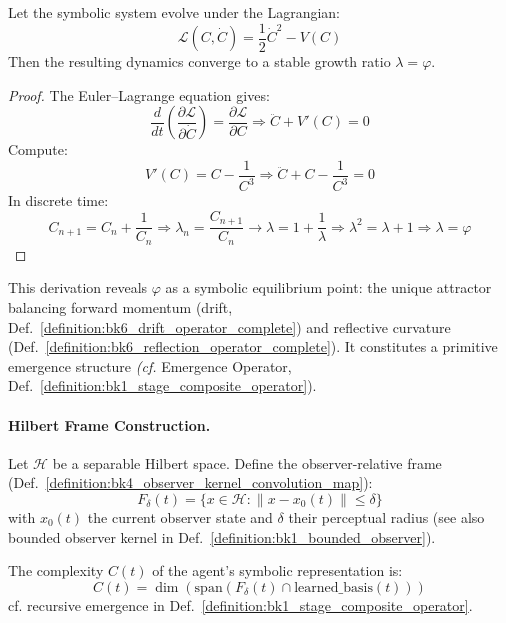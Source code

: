 \begin{theorem}
\label{theorem:appC_phi_from_lagrangian}
Let the symbolic system evolve under the Lagrangian:
\[
\mathcal{L}(C, \dot{C}) = \frac{1}{2} \dot{C}^2 - V(C)
\]
Then the resulting dynamics converge to a stable growth ratio $\lambda = \varphi$.
\end{theorem}

\begin{proof}
The Euler--Lagrange equation gives:
\[
\frac{d}{dt} \left( \frac{\partial \mathcal{L}}{\partial \dot{C}} \right) = \frac{\partial \mathcal{L}}{\partial C}
\Rightarrow \ddot{C} + V'(C) = 0
\]
Compute:
\[
V'(C) = C - \frac{1}{C^3}
\Rightarrow \ddot{C} + C - \frac{1}{C^3} = 0
\]
In discrete time:
\[
C_{n+1} = C_n + \frac{1}{C_n}
\Rightarrow \lambda_n = \frac{C_{n+1}}{C_n} \to \lambda = 1 + \frac{1}{\lambda}
\Rightarrow \lambda^2 = \lambda + 1
\Rightarrow \lambda = \varphi
\]
\end{proof}

\begin{scholium}
This derivation reveals $\varphi$ as a symbolic equilibrium point: the unique attractor balancing forward momentum (drift, Def.~\ref{definition:bk6_drift_operator_complete}) and reflective curvature (Def.~\ref{definition:bk6_reflection_operator_complete}). It constitutes a primitive emergence structure \textit{(cf.} Emergence Operator, Def.~\ref{definition:bk1_stage_composite_operator}).
\end{scholium}

\paragraph{Hilbert Frame Construction.}
\label{paragraph:appC_bounded_frame_dynamics_on_hilbert_manifolds}

\begin{definition}
\label{def:appC_bounded_observation_frame}
Let $\mathcal{H}$ be a separable Hilbert space. Define the observer-relative frame (Def.~\ref{definition:bk4_observer_kernel_convolution_map}):
\[
F_\delta(t) = \{x \in \mathcal{H} : \|x - x_0(t)\| \leq \delta\}
\]
with $x_0(t)$ the current observer state and $\delta$ their perceptual radius (see also bounded observer kernel in Def.~\ref{definition:bk1_bounded_observer}).
\end{definition}

\begin{definition}
\label{def:appC_complexity_measure}
The complexity $C(t)$ of the agent’s symbolic representation is:
\[
C(t) = \dim\left(\text{span}(F_\delta(t) \cap \text{learned\_basis}(t))\right)
\]
cf. recursive emergence in Def.~\ref{definition:bk1_stage_composite_operator}.
\end{definition}


